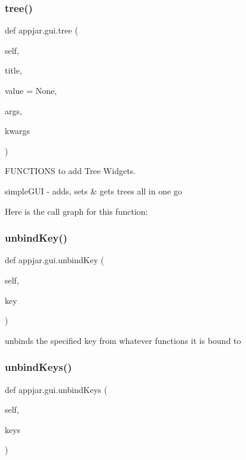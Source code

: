 \begin{DoxyVerb}
\subsubsection{\texorpdfstring{tree()}{tree()}}
{\footnotesize\ttfamily def appjar.\+gui.\+tree (\begin{DoxyParamCaption}\item[{}]{self,  }\item[{}]{title,  }\item[{}]{value = {\ttfamily None},  }\item[{}]{args,  }\item[{}]{kwargs }\end{DoxyParamCaption})}



F\+U\+N\+C\+T\+I\+O\+NS to add Tree Widgets. 

\begin{DoxyVerb}simpleGUI - adds, sets & gets trees all in one go \end{DoxyVerb}
 Here is the call graph for this function\+:
\mbox{\label{classappjar_1_1gui_a49468e5722bd7220d6a43cf647262367}} 
\subsubsection{\texorpdfstring{unbind\+Key()}{unbindKey()}}
{\footnotesize\ttfamily def appjar.\+gui.\+unbind\+Key (\begin{DoxyParamCaption}\item[{}]{self,  }\item[{}]{key }\end{DoxyParamCaption})}

\begin{DoxyVerb}unbinds the specified key from whatever functions it is bound to \end{DoxyVerb}
 \mbox{\label{classappjar_1_1gui_a9342b4f79427681dbc0471b087285ed4}} 
\subsubsection{\texorpdfstring{unbind\+Keys()}{unbindKeys()}}
{\footnotesize\ttfamily def appjar.\+gui.\+unbind\+Keys (\begin{DoxyParamCaption}\item[{}]{self,  }\item[{}]{keys }\end{DoxyParamCaption})}


\end{DoxyVerb}
